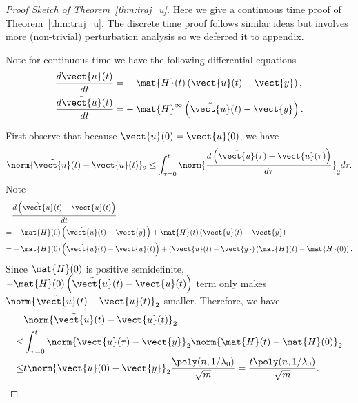 \begin{proof}[Proof Sketch of Theorem~\ref{thm:traj_u}]
Here we give a continuous time proof of Theorem~\ref{thm:traj_u}.
The discrete time proof follows similar ideas but involves more (non-trivial) perturbation analysis so we deferred it to appendix. 

Note for continuous time we have the following differential equations\begin{align*}
\frac{d \vect{u}(t)}{dt} = &-\mat{H}(t)\left(\vect{u}(t)-\vect{y}\right), \\
\frac{d \tilde{\vect{u}}(t)}{dt} = &- \mat{H}^{\infty}\left(\tilde{\vect{u}}(t)-\vect{y}\right).
\end{align*}

First observe that because $\tilde{\vect{u}}(0) = \vect{u}(0)$, we have \[
\norm{\tilde{\vect{u}}(t)-\vect{u}(t)}_2 \le \int_{\tau = 0}^t \norm{\frac{d\left(\tilde{\vect{u}}(\tau)-\vect{u}(\tau)\right)}{d \tau}}_2 d\tau.
\]
Note \begin{align*}
&\frac{d \left(\tilde{\vect{u}}(t)-\vect{u}(t)\right)}{dt} \\
= &-\mat{H}(0)\left(\tilde{\vect{u}}(t)-\vect{y}\right) + \mat{H}(t)\left(\vect{u}(t)-\vect{y}\right) \\
= &  -\mat{H}(0)\left(\tilde{\vect{u}}(t)-\vect{u}(t)\right) + \left(\vect{u}(t)-\vect{y}\right)\left(\mat{H}(t)-\mat{H}(0)\right).
\end{align*}
Since $\mat{H}(0)$ is positive semidefinite, $-\mat{H}(0)\left(\tilde{\vect{u}}(t)-\vect{u}(t)\right) $ term only makes $\norm{\tilde{\vect{u}}(t)-\vect{u}(t)}_2$ smaller.
Therefore, we have \begin{align*}
&\norm{\tilde{\vect{u}}(t)-\vect{u}(t)}_2 \\
\le &\int_{\tau =0}^t \norm{\vect{u}(\tau)-\vect{y}}_2 \norm{\mat{H}(t)-\mat{H}(0)}_2 \\
\le & t\norm{\vect{u}(0)-\vect{y}}_2 \frac{\poly(n,1/\lambda_0)}{\sqrt{m}} = \frac{t\poly(n,1/\lambda_0)}{\sqrt{m}} .
\end{align*}

\end{proof}




